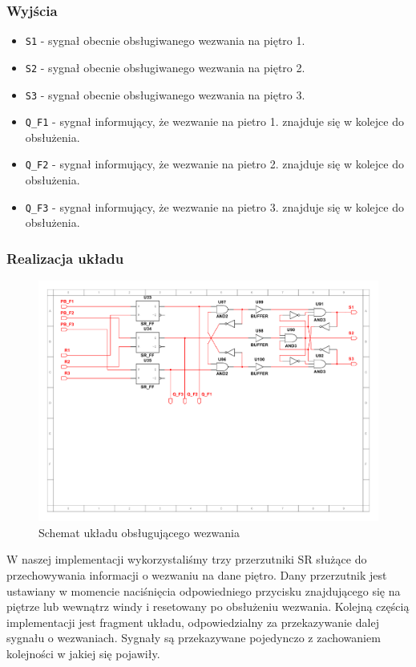 \documentclass[a4paper]{article}
\begin{document}
\subsubsection{Wyjścia}
\begin{itemize}
    \item \verb|S1| - sygnał obecnie obsługiwanego wezwania na piętro 1.
    \item \verb|S2| - sygnał obecnie obsługiwanego wezwania na piętro 2.
    \item \verb|S3| - sygnał obecnie obsługiwanego wezwania na piętro 3.
    \item \verb|Q_F1| - sygnał informujący, że wezwanie na pietro 1. znajduje się w kolejce do obsłużenia.
    \item \verb|Q_F2| - sygnał informujący, że wezwanie na pietro 2. znajduje się w kolejce do obsłużenia.
    \item \verb|Q_F3| - sygnał informujący, że wezwanie na pietro 3. znajduje się w kolejce do obsłużenia.
\end{itemize}

\subsubsection{Realizacja układu}
\begin{figure}[H]
    \centering
    \includegraphics[width=\textwidth]{call_controller.png_schemat.pdf}
    \caption{Schemat układu obsługującego wezwania}
\end{figure}

W naszej implementacji wykorzystaliśmy trzy przerzutniki SR służące do przechowywania
informacji o wezwaniu na dane piętro. Dany przerzutnik jest ustawiany w momencie naciśnięcia odpowiedniego 
przycisku znajdującego się na piętrze lub wewnątrz windy i resetowany po obsłużeniu wezwania.
Kolejną częścią implementacji jest fragment układu, odpowiedzialny za przekazywanie dalej sygnału o wezwaniach.
Sygnały są przekazywane pojedynczo z zachowaniem kolejności w jakiej się pojawiły. 
\end{document}
